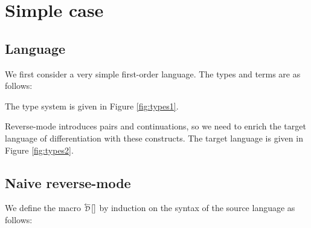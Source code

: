 \section{Simple case}

\subsection{Language}

We first consider a very simple first-order language. The types and terms are as follows:
% 

The type system is given in Figure \ref{fig:types1}.


Reverse-mode introduces pairs and continuations, so we need to enrich the target language of differentiation with these constructs.
The target language is given in Figure \ref{fig:types2}.


\subsection{Naive reverse-mode}

We define the macro $\Dsynrevsymbol[][]{}$ by induction on the syntax of the source language as follows:



